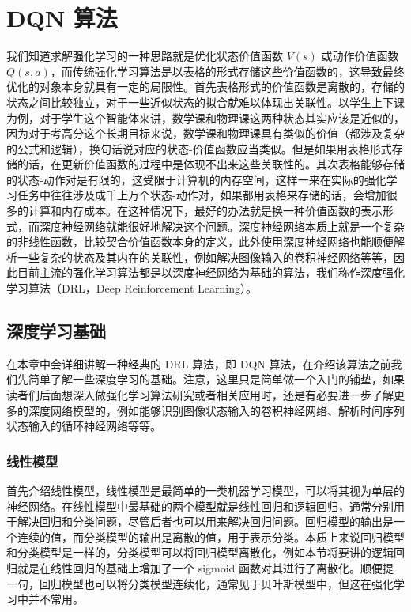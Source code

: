 \section{ DQN 算法}

我们知道求解强化学习的一种思路就是优化状态价值函数 $V(s)$ 或动作价值函数 $Q(s,a)$，而传统强化学习算法是以表格的形式存储这些价值函数的，这导致最终优化的对象本身就具有一定的局限性。首先表格形式的价值函数是离散的，存储的状态之间比较独立，对于一些近似状态的拟合就难以体现出关联性。以学生上下课为例，对于学生这个智能体来讲，数学课和物理课这两种状态其实应该是近似的，因为对于考高分这个长期目标来说，数学课和物理课具有类似的价值（都涉及复杂的公式和逻辑），换句话说对应的状态-价值函数应当类似。但是如果用表格形式存储的话，在更新价值函数的过程中是体现不出来这些关联性的。其次表格能够存储的状态-动作对是有限的，这受限于计算机的内存空间，这样一来在实际的强化学习任务中往往涉及成千上万个状态-动作对，如果都用表格来存储的话，会增加很多的计算和内存成本。在这种情况下，最好的办法就是换一种价值函数的表示形式，而深度神经网络就能很好地解决这个问题。深度神经网络本质上就是一个复杂的非线性函数，比较契合价值函数本身的定义，此外使用深度神经网络也能顺便解析一些复杂的状态及其内在的关联性，例如解决图像输入的卷积神经网络等等，因此目前主流的强化学习算法都是以深度神经网络为基础的算法，我们称作深度强化学习算法（DRL，Deep Reinforcement Learning）。

\subsection{深度学习基础}

在本章中会详细讲解一种经典的 DRL 算法，即 DQN 算法，在介绍该算法之前我们先简单了解一些深度学习的基础。注意，这里只是简单做一个入门的铺垫，如果读者们后面想深入做强化学习算法研究或者相关应用时，还是有必要进一步了解更多的深度网络模型的，例如能够识别图像状态输入的卷积神经网络、解析时间序列状态输入的循环神经网络等等。
\subsubsection{线性模型}

首先介绍线性模型，线性模型是最简单的一类机器学习模型，可以将其视为单层的神经网络。在线性模型中最基础的两个模型就是线性回归和逻辑回归，通常分别用于解决回归和分类问题，尽管后者也可以用来解决回归问题。回归模型的输出是一个连续的值，而分类模型的输出是离散的值，用于表示分类。本质上来说回归模型和分类模型是一样的，分类模型可以将回归模型离散化，例如本节将要讲的逻辑回归就是在线性回归的基础上增加了一个 sigmoid 函数对其进行了离散化。顺便提一句，回归模型也可以将分类模型连续化，通常见于贝叶斯模型中，但这在强化学习中并不常用。

